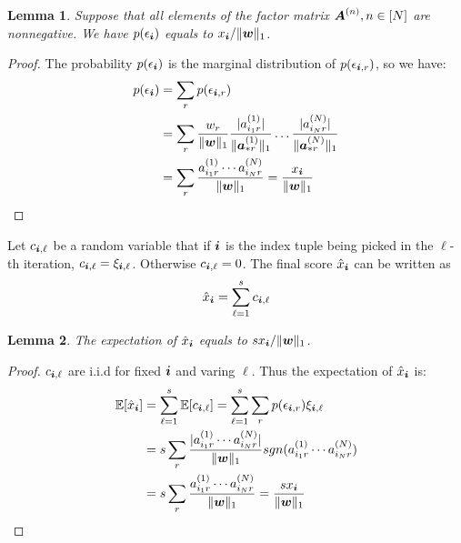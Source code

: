 \documentclass[letterpaper]{article}
\newcommand{\Sca}[3]{{#1}^{(#2)}_{i_#2#3}}%
\newcommand{\anr}[2]{\Sca{a}{#1}{#2}}
\newcommand{\score}[1]{\xi_{\V{i},#1}}
\newcommand{\V}[1]{{\boldsymbol{{\MakeLowercase{#1}}}}}
\newcommand{\ColVec}[3]{\V{#1}^{(#2)}_{#3}}
\newcommand{\NormColA}[2]{\norm{\ColVec{a}{#1}{*#2}}{1}}
\newcommand{\predx}{\hat{x}_{\V{i}}}
\newcommand{\M}[1]{{\boldsymbol{{\MakeUppercase{#1}}}}}
\newcommand{\norm}[2]{\|#1\|_{#2}}
\newtheorem{lemma}{Lemma}
\begin{document}
\begin{lemma}\label{lem:Probability}
    Suppose that all elements of the factor matrix $\M{A}^{(n)}, n\in[N]$ are nonnegative. We have
    $p(\epsilon_{\V{i}})$ equals to $x_{\V{i}}/\norm{\V{w}}{1}$.
\end{lemma}
\begin{proof}
The probability $p(\epsilon_{\V{i}})$ is the marginal distribution of $p(\epsilon_{\V{i},r})$,
so we have:
\begin{align*}
p(\epsilon_{\V{i}})
& = \sum_{r} p(\epsilon_{\V{i},r}) \\
& = \sum_{r} \frac{w_{r}}{\norm{\V{W}}{1}}
    \frac{|\anr{1}{r}|}{\NormColA{1}{r}} \ldots \frac{|\anr{N}{r}|}{\NormColA{N}{r}}\\
& = \sum_{r} \frac{\anr{1}{r}\cdots\anr{N}{r}}{\norm{\V{W}}{1}}
  = \frac{x_{\V{i}}}{\norm{\V{w}}{1}}
\end{align*}
\end{proof}
Let $c_{\V{i},\ell}$ be a random variable that if $\V{i}$ is the index tuple 
being picked in the $\ell$-th iteration, $c_{\V{i},\ell}=\score{\ell}$. 
Otherwise $c_{\V{i},\ell}=0$. 
The final score $\predx$ can be written as
\begin{equation}\label{eq:score}
\predx = \sum_{\ell=1}^{s} c_{\V{i},\ell}
\end{equation}

\begin{lemma}\label{lem:Expectation}
The expectation of $\predx$ equals to $sx_{\V{i}}/\norm{\V{w}}{1}$.
\end{lemma}
\begin{proof}
    $c_{\V{i},\ell}$ are i.i.d for fixed $\V{i}$ and varing $\ell$. 
    Thus the expectation of $\predx$ is:
\begin{align*}
\mathbb{E}[\predx]
& = \sum_{\ell=1}^{s}\mathbb{E}[c_{\V{i},\ell}] = \sum_{\ell=1}^{s}\sum_{r} p(\epsilon_{\V{i},r})\score{\ell} \\
& = s\sum_{r} \frac{|\anr{1}{r}\cdots\anr{N}{r}|}{\norm{\V{W}}{1}}
                  sgn(\anr{1}{r}\cdots\anr{N}{r})\\
& = s\sum_{r} \frac{\anr{1}{r}\cdots\anr{N}{r}}{\norm{\V{W}}{1}}
  = \frac{sx_{\V{i}}}{\norm{\V{w}}{1}}
\end{align*}
\end{proof}
\end{document}
